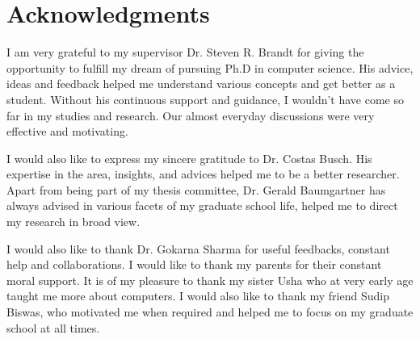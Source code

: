 \chapter*{Acknowledgments}
\label{ch:Acknowledgments}

I am very grateful to my supervisor Dr. Steven R. Brandt for giving the opportunity to fulfill my dream of pursuing Ph.D in computer science. His advice, ideas and feedback helped me understand various concepts and get better as a student. Without his continuous support and guidance, I wouldn't have come so far in my studies and research. Our almost everyday discussions were very effective and motivating.

I would also like to express my sincere gratitude to 
Dr. Costas Busch. His expertise in the area, insights,
and advices helped me to be a better researcher. Apart
from being part of my thesis committee, Dr. Gerald Baumgartner has always advised in various facets of
my graduate school life, helped me to direct my research
in broad view.

I would also like to thank Dr. Gokarna Sharma for useful feedbacks, constant help and collaborations. I would like to thank my parents for their constant moral support. It is of my pleasure to thank my sister Usha who at very early age taught me more about computers. I would also like to thank my friend Sudip Biswas, who motivated me when required and helped me to focus on my graduate school at all times.


